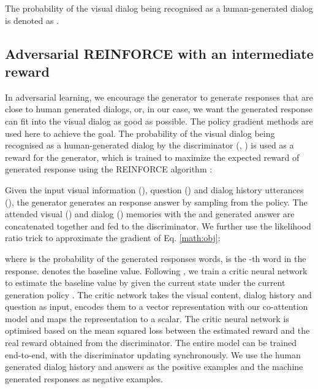 \documentclass[10pt,twocolumn,letterpaper]{article}
\begin{document}
The probability of the visual dialog being recognised as a human-generated dialog is denoted as .

\subsection{Adversarial REINFORCE with an intermediate reward}
\label{reinforce}
In adversarial learning, we encourage the generator to generate responses that are close to human generated dialogs, or, in our case, we want the generated response can fit into the visual dialog as good as possible. The policy gradient methods are used here to achieve the goal. The probability of the visual dialog being recognised as a human-generated dialog by the discriminator (\ie, ) is used as a reward for the generator, which is trained to maximize the expected reward of generated response using the REINFORCE algorithm \cite{williams1992simple}:

Given the input visual information (), question () and dialog history utterances (), the generator generates an response answer  by sampling from the policy. The attended visual () and dialog () memories with the  and generated answer  are concatenated together and fed to the discriminator. We further use the likelihood ratio trick \cite{williams1992simple} to approximate the gradient of Eq. \ref{math:obj}:

where  is the probability of the generated responses words,  is the -th word in the response.  denotes the baseline value. Following \cite{li2017adversarial}, we train a critic neural network to estimate the baseline value  by given the current state under the current generation policy . The critic network takes the visual content, dialog history and question as input, encodes them to a vector representation with our co-attention model and maps the representation to a scalar. The critic neural network is optimised based on the mean squared loss between the estimated reward and the real reward obtained from the discriminator. The entire model can be trained end-to-end, with the discriminator updating synchronously. We use the human generated dialog history and answers as the positive examples and the machine generated responses as negative examples.

\vspace{-5pt}
\end{document}
